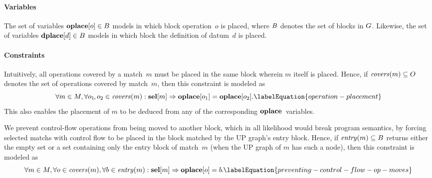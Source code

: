 \paragraph{Variables}

The set of \glspl{variable} \mbox{$\mVar{oplace}[o] \in \mBlockSet$} models in
which \gls{block} \gls{operation}~$o$ is placed, where $B$ denotes the
set of \glspl{block} in $G$.
%
Likewise, the set of \glspl{variable} \mbox{$\mVar{dplace}[d] \in \mBlockSet$}
models in which \gls{block} the definition of \gls{datum}~$d$ is placed.


\paragraph{Constraints}

Intuitively, all \glspl{operation} covered by a \gls{match}~$m$ must be placed
in the same \gls{block} wherein $m$ itself is placed.
%
Hence, if \mbox{$\mCovers(m) \subseteq \mOpSet$} denotes the set of
\glspl{operation} covered by \gls{match}~$m$, then this \gls{constraint} is
modeled as
%
\begin{equation}
  \forall m \in \mMatchSet,
  \forall o_1\hspace{-1pt}, o_2 \in \mCovers(m) :
  \mVar{sel}[m] \mImp \mVar{oplace}[o_1] = \mVar{oplace}[o_2].
  \labelEquation{operation-placement}
\end{equation}
%
This also enables the placement of $m$ to be deduced from any of the
corresponding $\mVar{oplace}$~\glspl{variable}.

We prevent control-flow \glspl{operation} from being moved to another
\gls{block}, which in all likelihood would break \gls{program} semantics, by
forcing selected \glspl{match} with control flow to be placed in the \gls{block}
matched by the \gls{UP graph}'s \gls{entry block}.
%
Hence, if \mbox{$\operatorname{\textrm{\textit{entry}}}(m) \subseteq B$} returns either the empty set
or a set containing only the \gls{entry block} of match~$m$ (when the \gls{UP
  graph} of $m$ has such a node), then this \gls{constraint} is modeled as
%
\begin{equation}
  \forall m \in \mMatchSet,
  \forall o \in \mCovers(m),
  \forall b \in \mEntry(m) :
  \mVar{sel}[m] \mImp \mVar{oplace}[o] = b \hspace{-1pt}.
  \labelEquation{preventing-control-flow-op-moves}
\end{equation}

